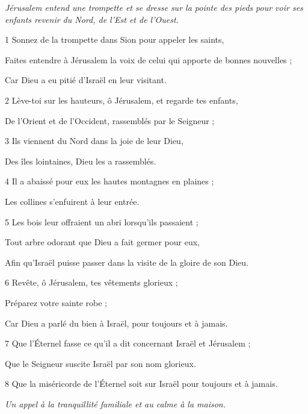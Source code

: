 
\par \textit{Jérusalem entend une trompette et se dresse sur la pointe des pieds pour voir ses enfants revenir du Nord, de l'Est et de l'Ouest.}

\par 1 Sonnez de la trompette dans Sion pour appeler les saints,
\par     Faites entendre à Jérusalem la voix de celui qui apporte de bonnes nouvelles ;
\par     Car Dieu a eu pitié d’Israël en leur visitant.
\par 2 Lève-toi sur les hauteurs, ô Jérusalem, et regarde tes enfants,
\par     De l'Orient et de l'Occident, rassemblés par le Seigneur ;
\par 3 Ils viennent du Nord dans la joie de leur Dieu,
\par     Des îles lointaines, Dieu les a rassemblés.
\par 4 Il a abaissé pour eux les hautes montagnes en plaines ;
\par     Les collines s'enfuirent à leur entrée.
\par 5 Les bois leur offraient un abri lorsqu'ils passaient ;
\par     Tout arbre odorant que Dieu a fait germer pour eux,
\par     Afin qu'Israël puisse passer dans la visite de la gloire de son Dieu.
\par 6 Revête, ô Jérusalem, tes vêtements glorieux ;
\par     Préparez votre sainte robe ;
\par     Car Dieu a parlé du bien à Israël, pour toujours et à jamais.
\par 7 Que l'Éternel fasse ce qu'il a dit concernant Israël et Jérusalem ;
\par     Que le Seigneur suscite Israël par son nom glorieux.
\par   
\par 8 Que la miséricorde de l'Éternel soit sur Israël pour toujours et à jamais.




\par \textit{Un appel à la tranquillité familiale et au calme à la maison.}

